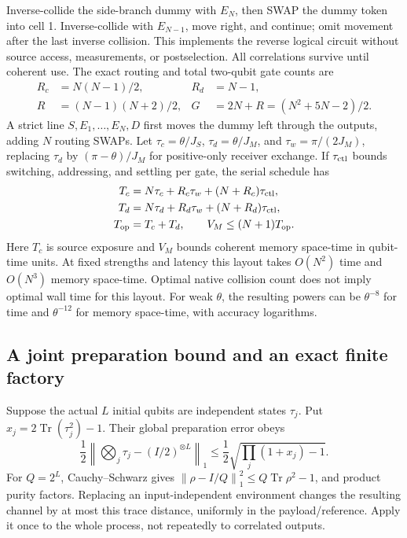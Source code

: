 \documentclass[11pt]{article}
\numberwithin{equation}{section}
\theoremstyle{remark}
\newcommand{\Tr}{\operatorname{Tr}}
\newcommand{\norm}[1]{\left\lVert#1\right\rVert}
\begin{document}
Inverse-collide the side-branch dummy with \(E_N\), then SWAP the dummy
token into cell 1. Inverse-collide with \(E_{N-1}\), move right, and
continue; omit movement after the last inverse collision. This implements
the reverse logical circuit without source access, measurements, or
postselection. All correlations survive until coherent use.
The exact routing and total two-qubit gate counts are
\begin{align}
 R_c&=N(N-1)/2,&R_d&=N-1,\\
 R&=(N-1)(N+2)/2,&G&=2N+R=(N^2+5N-2)/2.
 \label{eq:gate-counts}
\end{align}
A strict line \(S,E_1,\ldots,E_N,D\) first moves the dummy left through
the outputs, adding \(N\) routing SWAPs.
Let \(\tau_c=\theta/J_S\), \(\tau_d=\theta/J_M\), and
\(\tau_w=\pi/(2J_M)\), replacing \(\tau_d\) by \((\pi-\theta)/J_M\)
for positive-only receiver exchange. If \(\tau_{\rm ctl}\) bounds
switching, addressing, and settling per gate, the serial schedule has
\begin{align}
 T_c&=N\tau_c+R_c\tau_w+(N+R_c)\tau_{\rm ctl},\\
 T_d&=N\tau_d+R_d\tau_w+(N+R_d)\tau_{\rm ctl},\\
 T_{\rm op}&=T_c+T_d,\qquad V_M\le(N+1)T_{\rm op}.
 \label{eq:times}
\end{align}
Here \(T_c\) is source exposure and \(V_M\) bounds coherent memory
space-time in qubit-time units. At fixed strengths and latency this
layout takes \(O(N^2)\) time and \(O(N^3)\) memory space-time. Optimal
native collision count does not imply optimal wall time for this layout.
For weak \(\theta\), the resulting powers can be \(\theta^{-8}\) for time
and \(\theta^{-12}\) for memory space-time, with accuracy logarithms.

\subsection{A joint preparation bound and an exact finite factory}
Suppose the actual \(L\) initial qubits are independent states \(\tau_j\).
Put \(x_j=2\Tr(\tau_j^2)-1\). Their global preparation error obeys
\begin{equation}
 \frac12\norm{\bigotimes_j\tau_j-(I/2)^{\otimes L}}_1
 \le\frac12\sqrt{\prod_j(1+x_j)-1}.
 \label{eq:prep-bound}
\end{equation}
For \(Q=2^L\), Cauchy--Schwarz gives
\(\norm{\rho-I/Q}_1^2\le Q\Tr\rho^2-1\), and product purity factors.
Replacing an input-independent environment changes the resulting channel
by at most this trace distance, uniformly in the payload/reference.
Apply it once to the whole process, not repeatedly to correlated outputs.
\end{document}
